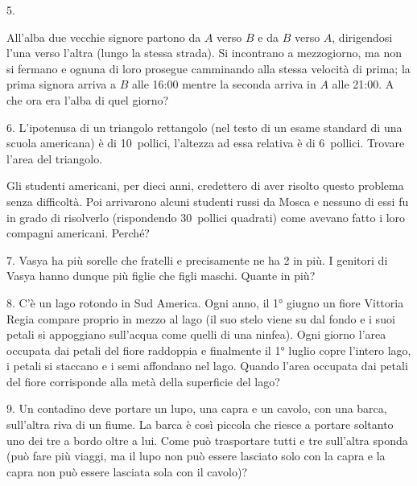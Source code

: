 \begin{problem}{5.}
	
All’alba due vecchie signore  partono da $A$ verso $B$ e da $B$ verso $A$, dirigendosi l’una verso l’altra (lungo la stessa strada). Si incontrano a mezzogiorno, ma non si fermano e ognuna di loro prosegue camminando alla stessa velocità di prima; la prima signora arriva a $B$ alle 16:00 mentre la seconda arriva in $A$ alle 21:00. A che ora era l’alba di quel giorno?

\end{problem}

\begin{problem}{6.}
	L’ipotenusa di un triangolo rettangolo (nel testo di un esame standard di una scuola americana) è di 10~pollici, l’altezza ad essa relativa è di 6~pollici. Trovare l’area del triangolo.

Gli studenti americani, per dieci anni, credettero di aver risolto questo problema senza difficoltà. Poi arrivarono alcuni studenti russi da Mosca e nessuno di essi fu in grado di risolverlo (rispondendo 30~pollici quadrati) come avevano fatto i loro compagni americani. Perché?
\end{problem}

\begin{problem}{7.}
	Vasya ha più sorelle che fratelli e precisamente ne ha 2 in più. I genitori di Vasya hanno dunque più figlie che figli maschi. Quante in più? 
\end{problem}

\begin{problem}{8.}
	C’è un lago rotondo in Sud America. Ogni anno, il 1° giugno un fiore Vittoria Regia compare proprio in mezzo al lago (il suo stelo viene su dal fondo e i suoi petali si appoggiano sull’acqua come quelli di una ninfea). Ogni giorno l’area occupata dai petali del fiore raddoppia e finalmente il 1° luglio  copre l’intero lago,  i petali si staccano e i semi affondano nel lago. Quando l’area occupata dai petali del fiore corrisponde alla metà della superficie del lago?
\end{problem}

\begin{problem}{9.}
	Un contadino deve portare un lupo, una capra e un cavolo, con una barca, sull’altra riva di un fiume. La barca è così piccola che riesce a portare soltanto uno dei tre a bordo oltre a lui. Come può trasportare tutti e tre sull’altra sponda (può fare più viaggi, ma il lupo non può essere lasciato solo con la capra e la capra non può essere lasciata sola con il cavolo)?
\end{problem}

